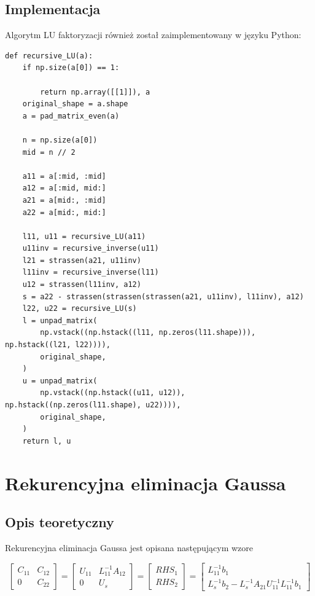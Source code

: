 \documentclass{article}
\begin{document}
\subsection{Implementacja}

Algorytm LU faktoryzacji również został zaimplementowany w języku Python:

\begin{verbatim}
def recursive_LU(a):
    if np.size(a[0]) == 1:

        return np.array([[1]]), a
    original_shape = a.shape
    a = pad_matrix_even(a)

    n = np.size(a[0])
    mid = n // 2

    a11 = a[:mid, :mid]
    a12 = a[:mid, mid:]
    a21 = a[mid:, :mid]
    a22 = a[mid:, mid:]

    l11, u11 = recursive_LU(a11)
    u11inv = recursive_inverse(u11)
    l21 = strassen(a21, u11inv)
    l11inv = recursive_inverse(l11)
    u12 = strassen(l11inv, a12)
    s = a22 - strassen(strassen(strassen(a21, u11inv), l11inv), a12)
    l22, u22 = recursive_LU(s)
    l = unpad_matrix(
        np.vstack((np.hstack((l11, np.zeros(l11.shape))), np.hstack((l21, l22)))),
        original_shape,
    )
    u = unpad_matrix(
        np.vstack((np.hstack((u11, u12)), np.hstack((np.zeros(l11.shape), u22)))),
        original_shape,
    )
    return l, u
\end{verbatim}

\section{Rekurencyjna eliminacja Gaussa}

\subsection{Opis teoretyczny}

Rekurencyjna eliminacja Gaussa jest opisana następującym wzore

\[
    \begin{bmatrix}
        C_{11} & C_{12} \\
        0 & C_{22}
    \end{bmatrix}
    =
    \begin{bmatrix}
        U_{11} & L_{11}^{-1}A_{12} \\
        0 & U_s
    \end{bmatrix}
    =
    \begin{bmatrix}
        RHS_{1}\\
        RHS_{2}
    \end{bmatrix}
    =
    \begin{bmatrix}
        L_{11}^{-1}b_{1} \\
        L_s^{-1}b_2 - L_s^{-1}A_{21}U_{11}^{-1}L_{11}^{-1}b_1
    \end{bmatrix}
\]
\end{document}
